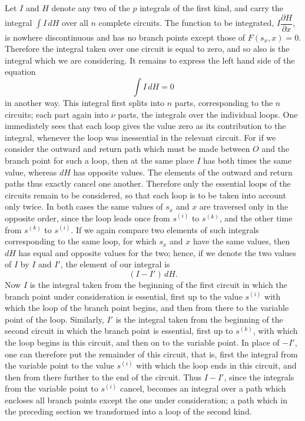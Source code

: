 \documentclass[10pt]{article}
\begin{document}
Let \(I\) and \(H\) denote any two of the \(p\) integrals of the first kind, and carry the integral \(\int I\,dH\) over all \(n\) complete circuits. The function to be integrated, \(I\dfrac{\partial H}{\partial x}\), is nowhere discontinuous and has no branch points except those of \(F(s_x,x)=0\). Therefore the integral taken over one circuit is equal to zero, and so also is the integral which we are considering. It remains to express the left hand side of the equation
\[
\int I\,dH=0
\]
in another way. This integral first splits into \(n\) parts, corresponding to the \(n\) circuits; each part again into \(\nu\) parts, the integrals over the individual loops. One immediately sees that each loop gives the value zero as its contribution to the integral, whenever the loop was inessential in the relevant circuit. For if we consider the outward and return path which must be made between \(O\) and the branch point for such a loop, then at the same place \(I\) has both times the same value, whereas \(dH\) has opposite values. The elements of the outward and return paths thus exactly cancel one another. Therefore only the essential loops of the circuits remain to be considered, so that each loop is to be taken into account only twice. In both cases the same values of \(s_x\) and \(x\) are traversed only in the opposite order, since the loop leads once from \(s^{(i)}\) to \(s^{(k)}\), and the other time from \(s^{(k)}\) to \(s^{(i)}\). If we again compare two elements of such integrals corresponding to the same loop, for which \(s_x\) and \(x\) have the same values, then \(dH\) has equal and opposite values for the two; hence, if we denote the two values of \(I\) by \(I\) and \(I'\), the element of our integral is
\[
(I-I')\,dH.
\]
Now \(I\) is the integral taken from the beginning of the first circuit in which the branch point under consideration is essential, first up to the value \(s^{(i)}\) with which the loop of the branch point begins, and then from there to the variable point of the loop. Similarly, \(I'\) is the integral taken from the beginning of the second circuit in which the branch point is essential, first up to \(s^{(k)}\), with which the loop begins in this circuit, and then on to the variable point. In place of \(-I'\), one can therefore put the remainder of this circuit, that is, first the integral from the variable point to the value \(s^{(i)}\) with which the loop ends in this circuit, and then from there further to the end of the circuit. Thus \(I-I'\), since the integrals from the variable point to \(s^{(i)}\) cancel, becomes an integral over a path which encloses all branch points except the one under consideration; a path which in the preceding section we transformed into a loop of the second kind.
\end{document}
